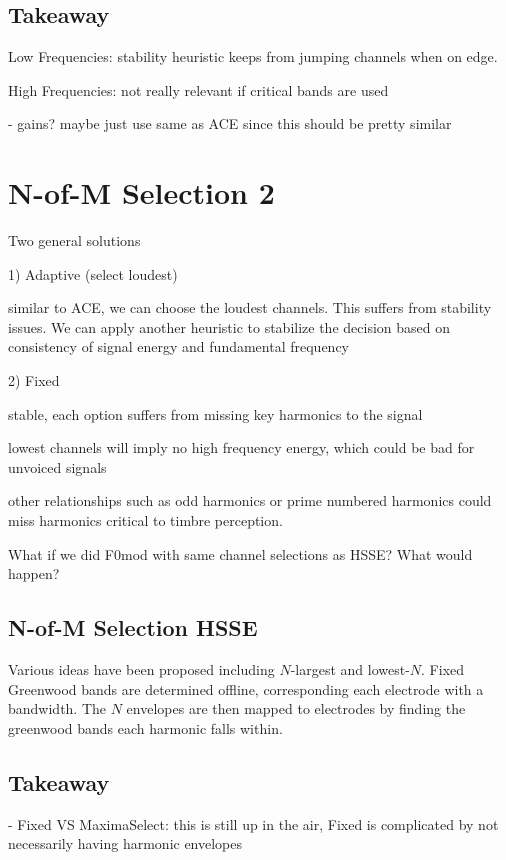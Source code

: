 \documentclass [11pt, proquest] {uwthesis}[2015/03/03]
\begin{document}
\subsection{Takeaway}

Low Frequencies: stability heuristic keeps from jumping channels when on edge.

High Frequencies: not really relevant if critical bands are used

- gains?  maybe just use same as ACE since this should be pretty similar
 

\section{N-of-M Selection 2}

Two general solutions

1) Adaptive (select loudest)

similar to ACE, we can choose the loudest channels.  This suffers from stability issues.  We can apply another heuristic to stabilize the decision based on consistency of signal energy and fundamental frequency

2) Fixed

stable, each option suffers from missing key harmonics to the signal

lowest channels will imply no high frequency energy, which could be bad for unvoiced signals

other relationships such as odd harmonics or prime numbered harmonics could miss harmonics critical to timbre perception.

What if we did F0mod with same channel selections as HSSE?  What would happen?

\subsection{N-of-M Selection HSSE}

Various ideas have been proposed including $N$-largest and lowest-$N$.  Fixed Greenwood bands are determined offline, corresponding each electrode with a bandwidth.  The $N$ envelopes are then mapped to electrodes by finding the greenwood bands each harmonic falls within.


\subsection{Takeaway}

 - Fixed VS MaximaSelect: this is still up in the air, Fixed is complicated by not necessarily having harmonic envelopes
 
\end{document}
